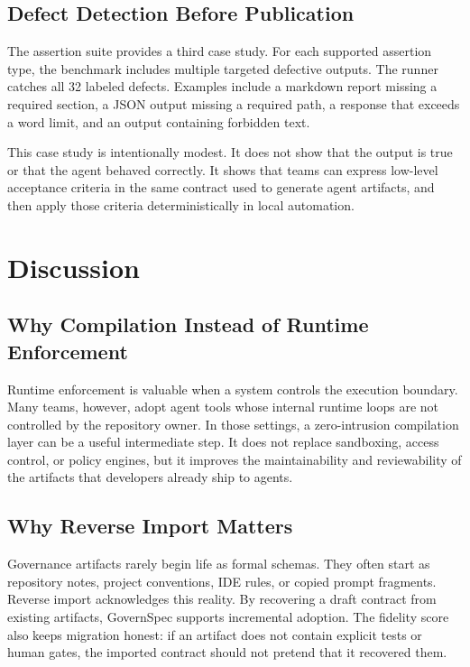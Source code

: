 \documentclass[11pt]{article}
\begin{document}
\subsection{Defect Detection Before Publication}

The assertion suite provides a third case study. For each supported assertion type,
the benchmark includes multiple targeted defective outputs. The runner catches all 32
labeled defects. Examples include a markdown report missing a required section, a
JSON output missing a required path, a response that exceeds a word limit, and an
output containing forbidden text.

This case study is intentionally modest. It does not show that the output is true or
that the agent behaved correctly. It shows that teams can express low-level
acceptance criteria in the same contract used to generate agent artifacts, and then
apply those criteria deterministically in local automation.

\section{Discussion}

\subsection{Why Compilation Instead of Runtime Enforcement}

Runtime enforcement is valuable when a system controls the execution boundary. Many
teams, however, adopt agent tools whose internal runtime loops are not controlled by
the repository owner. In those settings, a zero-intrusion compilation layer can be a
useful intermediate step. It does not replace sandboxing, access control, or policy
engines, but it improves the maintainability and reviewability of the artifacts that
developers already ship to agents.

\subsection{Why Reverse Import Matters}

Governance artifacts rarely begin life as formal schemas. They often start as
repository notes, project conventions, IDE rules, or copied prompt fragments.
Reverse import acknowledges this reality. By recovering a draft contract from
existing artifacts, GovernSpec supports incremental adoption. The fidelity score
also keeps migration honest: if an artifact does not contain explicit tests or
human gates, the imported contract should not pretend that it recovered them.
\end{document}

